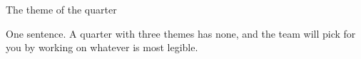 \begin{frame}{The theme of the quarter}
  \begin{glass}
  One sentence. A quarter with three themes has none, and the team will pick for you by
  working on whatever is most legible.
  \end{glass}
\end{frame}
